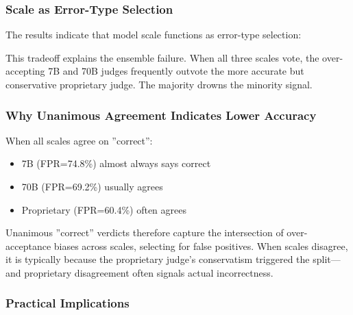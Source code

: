 
\subsubsection{Scale as Error-Type Selection}

The results indicate that model scale functions as error-type selection:

\begin{table}[htbp]
\centering
{}
\end{table}

This tradeoff explains the ensemble failure. When all three scales vote, the over-accepting 7B and 70B judges frequently outvote the more accurate but conservative proprietary judge. The majority drowns the minority signal.

\subsubsection{Why Unanimous Agreement Indicates Lower Accuracy}

When all scales agree on ''correct'':
\begin{itemize}
\item 7B (FPR=74.8\%) almost always says correct
\item 70B (FPR=69.2\%) usually agrees
\item Proprietary (FPR=60.4\%) often agrees
\end{itemize}

Unanimous ''correct'' verdicts therefore capture the intersection of over-acceptance biases across scales, selecting for false positives. When scales disagree, it is typically because the proprietary judge's conservatism triggered the split---and proprietary disagreement often signals actual incorrectness.

\subsubsection{Practical Implications}

